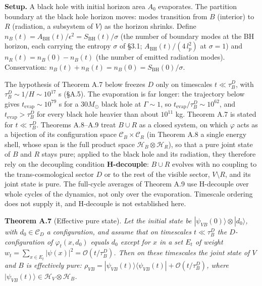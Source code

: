 \documentclass[
]{article}
\begin{document}
\textbf{Setup.} A black hole with initial horizon area \(A_0\)
evaporates. The partition boundary at the black hole horizon moves:
modes transition from \(B\) (interior) to \(R\) (radiation, a subsystem
of \(V\)) as the horizon shrinks. Define
\(n_B(t) = A_{\text{BH}}(t)/\epsilon^2 = S_{\text{BH}}(t)/\sigma\) (the
number of boundary modes at the BH horizon, each carrying the entropy
\(\sigma\) of §3.1; \(A_{\text{BH}}(t)/(4\,l_p^2)\) at \(\sigma = 1\))
and \(n_R(t) = n_B(0) - n_B(t)\) (the number of emitted radiation
modes). Conservation:
\(n_B(t) + n_R(t) = n_B(0) = S_{\text{BH}}(0)/\sigma\).

The hypothesis of Theorem A.7 below freezes \(D\) only on timescales
\(t \ll \tau_B^D\), with \(\tau_B^D \sim 1/H \sim 10^{17}\) s (§A.5).
The evaporation is far longer: the trajectory below gives
\(t_{\text{evap}} \sim 10^{79}\) s for a \(30 M_\odot\) black hole at
\(\Gamma \sim 1\), so \(t_{\text{evap}}/\tau_B^D \sim 10^{62}\), and
\(t_{\text{evap}} > \tau_B^D\) for every black hole heavier than about
\(10^{11}\) kg. Theorem A.7 is stated for \(t \ll \tau_B^D\). Theorems
A.8--A.9 treat \(B \cup R\) as a closed system, on which \(\varphi\)
acts as a bijection of its configuration space
\(\mathcal{C}_B \times \mathcal{C}_R\) (in Theorem A.8 a single energy
shell, whose span is the full product space
\(\mathcal{H}_B \otimes \mathcal{H}_R\)), so that a pure joint state of
\(B\) and \(R\) stays pure; applied to the black hole and its radiation,
they therefore rely on the decoupling condition \textbf{H-decouple}:
\(B \cup R\) evolves with no coupling to the trans-cosmological sector
\(D\) or to the rest of the visible sector, \(V \setminus R\), and its
joint state is pure. The full-cycle averages of Theorem A.9 use
H-decouple over whole cycles of the dynamics, not only over the
evaporation. Timescale ordering does not supply it, and H-decouple is
not established here.

\textbf{Theorem A.7} (Effective pure state). \emph{Let the initial state
be \(|\psi_{VB}(0)\rangle \otimes |d_0\rangle\), with
\(d_0 \in \mathcal{C}_D\) a configuration, and assume that on timescales
\(t \ll \tau_B^D\) the \(D\)-configuration of \(\varphi_t(x, d_0)\)
equals \(d_0\) except for \(x\) in a set \(E_t\) of weight
\(w_t = \sum_{x \in E_t} |\psi(x)|^2 = \mathcal{O}(t / \tau_B^D)\). Then
on these timescales the joint state of \(V\) and \(B\) is effectively
pure:
\(\rho_{VB} = |\psi_{VB}(t)\rangle\langle\psi_{VB}(t)| + \mathcal{O}(t / \tau_B^D)\),
where \(|\psi_{VB}(t)\rangle \in \mathcal{H}_V \otimes \mathcal{H}_B\).}
\end{document}
